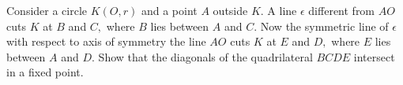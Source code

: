 Consider a circle $K(O,r)$ and a point $A$ outside $K.$ A line $\epsilon$ different from $AO$ cuts $K$ at $B$ and $C,$ where $B$ lies between $A$ and $C.$
Now the symmetric line of $\epsilon$ with respect to axis of symmetry the  line $AO$ cuts $K$ at $E$ and $D,$ where $E$ lies between $A$ and $D.$
Show that  the diagonals of the quadrilateral $BCDE$ intersect in a fixed point.